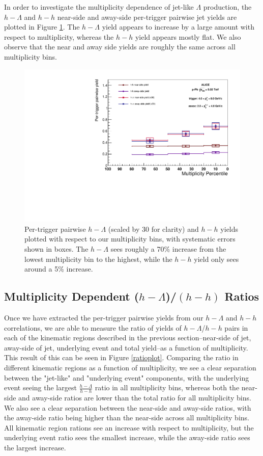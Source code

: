 \documentclass[ALICE,manyauthors]{ALICE_analysis_notes}
\begin{document}
In order to investigate the multiplicity dependence of jet-like $\Lambda$ production, the $h-\Lambda$ and $h-h$ near-side and away-side per-trigger pairwise jet yields are plotted in Figure \ref{final_pairwise_yields}. The $h-\Lambda$ yield appears to increase by a large amount with respect to multiplicity, whereas the $h-h$ yield appears mostly flat. We also observe that the near and away side yields are roughly the same across all multiplicity bins.

\begin{figure}[ht]
\centering
\includegraphics[width=6in]{figures/pairwise_plot.pdf}
\caption{Per-trigger pairwise $h-\Lambda$ (scaled by 30 for clarity) and $h-h$ yields plotted with respect to our multiplicity bins, with systematic errors shown in boxes. The $h-\Lambda$ sees roughly a 70\% increase from the lowest multiplicity bin to the highest, while the $h-h$ yield only sees around a 5\% increase.}
\label{final_pairwise_yields}
\end{figure}


\subsection{Multiplicity Dependent ($h-\Lambda$)/$(h-h)$ Ratios}

Once we have extracted the per-trigger pairwise yields from our $h-\Lambda$ and $h-h$ correlations, we are able to measure the ratio of yields of $h-\Lambda$/$h-h$ pairs in each of the kinematic regions described in the previous section--near-side of jet, away-side of jet, underlying event and total yield--as a function of multiplicity. This result of this can be seen in Figure \ref{ratioplot}. Comparing the ratio in different kinematic regions as a function of multiplicity, we see a clear separation between the "jet-like" and "underlying event" components, with the underlying event seeing the largest $\frac{h-\Lambda}{h-h}$ ratio in all multiplicity bins, whereas both the near-side and away-side ratios are lower than the total ratio for all multiplicity bins. We also see a clear separation between the near-side and away-side ratios, with the away-side ratio being higher than the near-side across all multiplicity bins. All kinematic region rations see an increase with respect to multiplicity, but the underlying event ratio sees the smallest increase, while the away-side ratio sees the largest increase.
\end{document}
